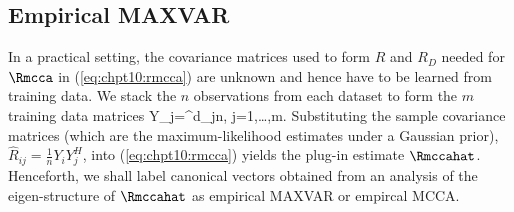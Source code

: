 \subsection{Empirical MAXVAR}
In  a practical setting, the covariance matrices used to form $R$ and $R_D$ needed
for $\Rmcca$ in (\ref{eq:chpt10:rmcca}) are unknown and hence have to be learned from
training data. We stack the $n$ observations from each dataset to form the $m$ training
data matrices 
\beq\label{eq:chpt10:data_matrices}
Y_j=\in\complex^{d_j\times n}, j=1,\dots,m.
\eeq
Substituting the sample covariance matrices (which are the maximum-likelihood estimates under a Gaussian prior),
$\widehat{R}_{ij}=\frac{1}{n}Y_iY_j^H$, into (\ref{eq:chpt10:rmcca}) yields the plug-in estimate
$\Rmccahat$. Henceforth, we shall label canonical vectors obtained from an  analysis of the eigen-structure of $\Rmccahat$ as empirical
MAXVAR or empircal MCCA.

